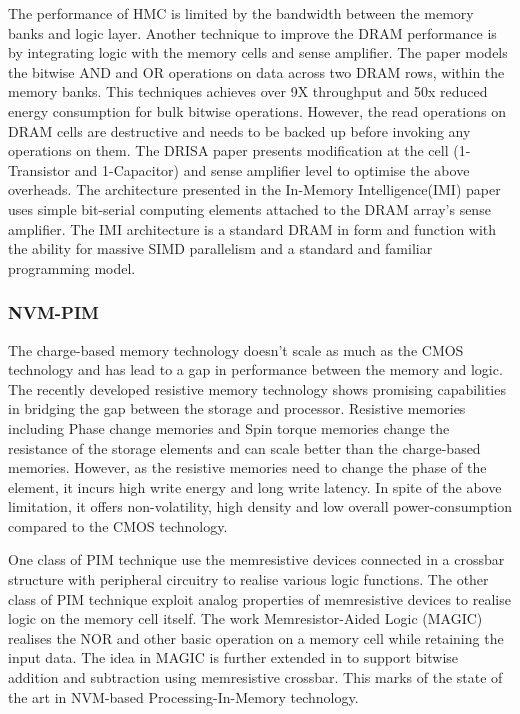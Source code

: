       The performance of HMC is limited by the bandwidth between the memory banks and logic layer. Another technique to improve the DRAM performance is by integrating logic with the memory cells and sense amplifier. The paper \cite{bulkbit} models the bitwise AND and OR operations on data across two DRAM rows, within the memory banks. This techniques achieves over 9X throughput and 50x reduced energy consumption for bulk bitwise operations. However, the read operations on DRAM cells are destructive and needs to be backed up before invoking any operations on them. The DRISA paper \cite{drisa} presents modification at the cell (1-Transistor and 1-Capacitor) and sense amplifier level to optimise the above overheads. The architecture presented in the In-Memory Intelligence(IMI) paper \cite{imi} uses simple bit-serial computing elements attached to the DRAM array's sense amplifier. The IMI architecture is a standard DRAM in form and function with the ability for massive SIMD parallelism and a standard and familiar programming model.

    \subsubsection{NVM-PIM}
      The charge-based memory technology doesn't scale as much as the CMOS technology and has lead to a gap in performance between the memory and logic. The recently developed resistive memory technology \cite{memres} shows promising capabilities in bridging the gap between the storage and processor. Resistive memories including Phase change memories and Spin torque memories change the resistance of the storage elements and can scale better than the charge-based memories. However, as the resistive memories need to change the phase of the element, it incurs high write energy and long write latency. In spite of the above limitation, it offers non-volatility, high density and low overall power-consumption compared to the CMOS technology\cite{tcamrram}.
      
      One class of PIM technique \cite{xbarcomp, xbrml} use the memresistive devices connected in a crossbar structure with peripheral circuitry to realise various logic functions. The other class of PIM technique \cite{magic,imply} exploit analog properties of memresistive devices to realise logic on the memory cell itself. The work Memresistor-Aided Logic (MAGIC) \cite{magic} realises the NOR and other basic operation on a memory cell while retaining the input data. The idea in MAGIC is further extended in \cite{magic-add} to support bitwise addition and subtraction using memresistive crossbar. This marks of the state of the art in NVM-based Processing-In-Memory technology.